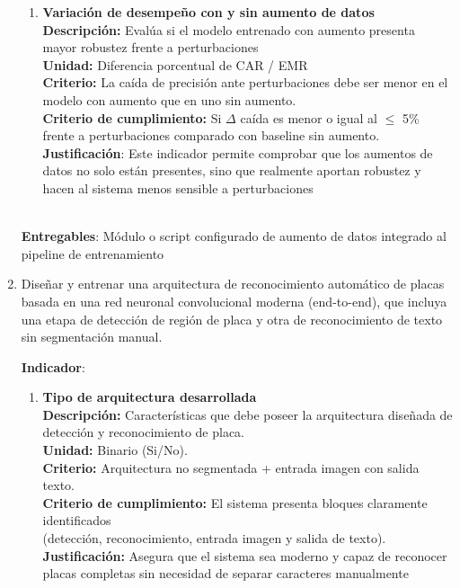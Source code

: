 \begin{enumerate}
\begin{enumerate}
			\item \textbf{Variación de desempeño con y sin aumento de datos} \\
			\textbf{Descripción: }Evalúa si el modelo entrenado con aumento presenta mayor robustez frente a perturbaciones \\
			\textbf{Unidad: }Diferencia porcentual de CAR / EMR \\
			\textbf{Criterio: }La caída de precisión ante perturbaciones debe ser menor 
			en el modelo con aumento que en uno sin aumento. \\
			\textbf{Criterio de cumplimiento:} Si $\Delta$ caída es menor o igual al $\leq$ 5\%
				frente a perturbaciones comparado con baseline sin aumento. \\
			\textbf{Justificación}:  Este indicador permite comprobar que los aumentos de datos no solo están presentes,
				sino que realmente aportan robustez y hacen al sistema menos sensible a perturbaciones\\ \\
		\end{enumerate}

		\textbf{Entregables}: Módulo o script configurado de aumento de datos integrado al pipeline de entrenamiento

	\item Diseñar y entrenar una arquitectura de reconocimiento automático de placas basada en una red neuronal convolucional 
		moderna (end-to-end), que incluya una etapa de detección de región de placa 
		y otra de reconocimiento de texto sin segmentación manual.

		\textbf{Indicador}:
		\begin{enumerate}
			\item \textbf{Tipo de arquitectura desarrollada} \\
			\textbf{Descripción: }Características que debe poseer la arquitectura diseñada de detección
				y reconocimiento de placa. \\
				\textbf{Unidad: }Binario (Si/No). \\
			\textbf{Criterio: }Arquitectura no segmentada + entrada imagen con salida texto. \\
			\textbf{Criterio de cumplimiento:} El sistema presenta bloques claramente identificados \\
				(detección, reconocimiento, entrada imagen y salida de texto). \\
			\textbf{Justificación:}  Asegura que el sistema sea moderno y capaz
				de reconocer placas completas sin necesidad de separar caracteres manualmente \\\\
		\end{enumerate}


\end{enumerate}

